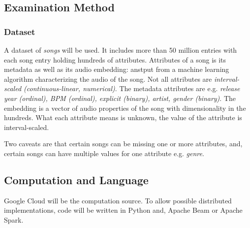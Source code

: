 \documentclass[a4paper,11pt]{article}
\begin{document}


\subsection{Examination Method}

\subsubsection{Dataset}

A dataset of \textit{songs} will be used. It includes more than 50 million
entries with each song entry holding hundreds of attributes. Attributes
of a song is its metadata as well as its audio embedding: anstput from
a machine learning algorithm characterizing the audio of the song. Not
all attributes are \textit{interval-scaled (continuous-linear, numerical)}. The metadata
attributes are e.g. \textit{release year (ordinal), BPM (ordinal),
explicit (binary), artist, gender (binary)}. The embedding is a vector of
audio properties of the song with dimensionality in the hundreds. What
each attribute means is unknown, the value of the attribute is
interval-scaled.

Two caveats are that certain songs can be missing one or more attributes, and, certain songs can have multiple values for one attribute e.g. \textit{genre}.


\subsection{Computation and Language}

Google Cloud will be the computation source. To allow possible
distributed implementations, code will be written in Python and, Apache
Beam or Apache Spark.

\end{document}
